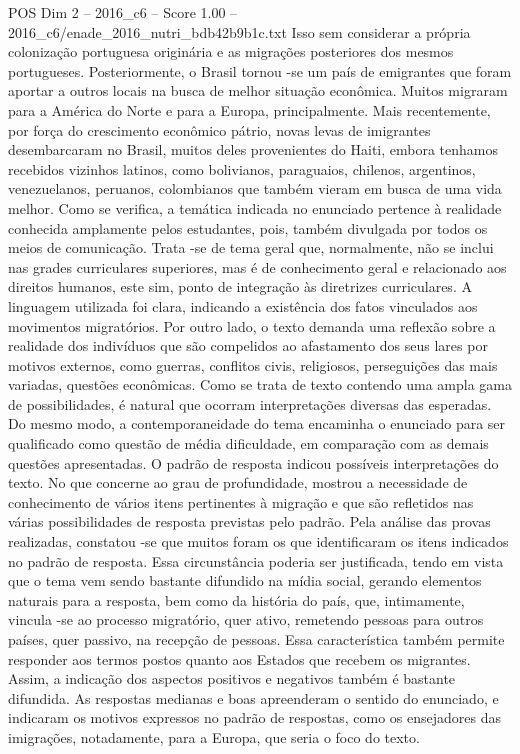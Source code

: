 \begin{textsample}{POS Dim 2 – 2016\_c6 – Score 1.00 – 2016\_c6/enade\_2016\_nutri\_bdb42b9b1c.txt}
Isso sem considerar a própria colonização portuguesa originária e as migrações posteriores dos mesmos portugueses.
Posteriormente, o Brasil tornou -se um país de emigrantes que foram aportar a outros locais na busca de melhor situação econômica.
Muitos migraram para a América do Norte e para a Europa, principalmente.
Mais recentemente, por força do crescimento econômico pátrio, novas levas de imigrantes desembarcaram no Brasil, muitos deles provenientes do Haiti, embora tenhamos recebidos vizinhos latinos, como bolivianos, paraguaios, chilenos, argentinos, venezuelanos, peruanos, colombianos que também vieram em busca de uma vida melhor.
Como se verifica, a temática indicada no enunciado pertence à realidade conhecida amplamente pelos estudantes, pois, também divulgada por todos os meios de comunicação.
Trata -se de tema geral que, normalmente, não se inclui nas grades curriculares superiores, mas é de conhecimento geral e relacionado aos direitos humanos, este sim, ponto de integração às diretrizes curriculares.
A linguagem utilizada foi clara, indicando a existência dos fatos vinculados aos movimentos migratórios.
Por outro lado, o texto demanda uma reflexão sobre a realidade dos indivíduos que são compelidos ao afastamento dos seus lares por motivos externos, como guerras, conflitos civis, religiosos, perseguições das mais variadas, questões econômicas.
Como se trata de texto contendo uma ampla gama de possibilidades, é natural que ocorram interpretações diversas das esperadas.
Do mesmo modo, a contemporaneidade do tema encaminha o enunciado para ser qualificado como questão de média dificuldade, em comparação com as demais questões apresentadas.
O padrão de resposta indicou possíveis interpretações do texto.
No que concerne ao grau de profundidade, mostrou a necessidade de conhecimento de vários itens pertinentes à migração e que são refletidos nas várias possibilidades de resposta previstas pelo padrão.
Pela análise das provas realizadas, constatou -se que muitos foram os que identificaram os itens indicados no padrão de resposta.
Essa circunstância poderia ser justificada, tendo em vista que o tema vem sendo bastante difundido na mídia social, gerando elementos naturais para a resposta, bem como da história do país, que, intimamente, vincula -se ao processo migratório, quer ativo, remetendo pessoas para outros países, quer passivo, na recepção de pessoas.
Essa característica também permite responder aos termos postos quanto aos Estados que recebem os migrantes.
Assim, a indicação dos aspectos positivos e negativos também é bastante difundida.
As respostas medianas e boas apreenderam o sentido do enunciado, e indicaram os motivos expressos no padrão de respostas, como os ensejadores das imigrações, notadamente, para a Europa, que seria o foco do texto.

\end{textsample}

